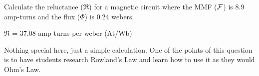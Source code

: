

Calculate the reluctance ($\Re$) for a magnetic circuit where the MMF ($\cal F$) is 8.9 amp-turns and the flux ($\Phi$) is 0.24 webers.







$\Re$ = 37.08 amp-turns per weber (At/Wb)







Nothing special here, just a simple calculation.  One of the points of this question is to have students research Rowland's Law and learn how to use it as they would Ohm's Law.




